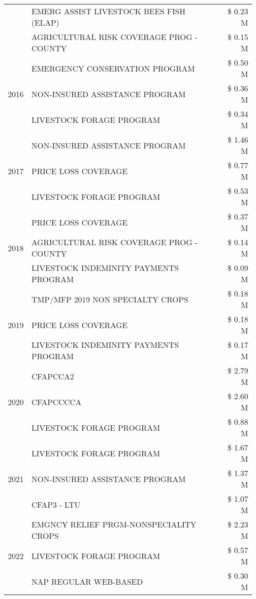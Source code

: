 \begin{tabular}{llr}
 & EMERG ASSIST LIVESTOCK BEES FISH (ELAP) & \$ 0.23 M \\
 & AGRICULTURAL RISK COVERAGE PROG - COUNTY & \$ 0.15 M \\
\cline{1-3}
\multirow[t]{3}{*}{2016} & EMERGENCY CONSERVATION PROGRAM & \$ 0.50 M \\
 & NON-INSURED ASSISTANCE PROGRAM & \$ 0.36 M \\
 & LIVESTOCK FORAGE PROGRAM & \$ 0.34 M \\
\cline{1-3}
\multirow[t]{3}{*}{2017} & NON-INSURED ASSISTANCE PROGRAM & \$ 1.46 M \\
 & PRICE LOSS COVERAGE & \$ 0.77 M \\
 & LIVESTOCK FORAGE PROGRAM & \$ 0.53 M \\
\cline{1-3}
\multirow[t]{3}{*}{2018} & PRICE LOSS COVERAGE & \$ 0.37 M \\
 & AGRICULTURAL RISK COVERAGE PROG - COUNTY & \$ 0.14 M \\
 & LIVESTOCK INDEMINITY PAYMENTS PROGRAM & \$ 0.09 M \\
\cline{1-3}
\multirow[t]{3}{*}{2019} & TMP/MFP 2019 NON SPECIALTY CROPS & \$ 0.18 M \\
 & PRICE LOSS COVERAGE & \$ 0.18 M \\
 & LIVESTOCK INDEMINITY PAYMENTS PROGRAM & \$ 0.17 M \\
\cline{1-3}
\multirow[t]{3}{*}{2020} & CFAPCCA2 & \$ 2.79 M \\
 & CFAPCCCCA & \$ 2.60 M \\
 & LIVESTOCK FORAGE PROGRAM & \$ 0.88 M \\
\cline{1-3}
\multirow[t]{3}{*}{2021} & LIVESTOCK FORAGE PROGRAM & \$ 1.67 M \\
 & NON-INSURED ASSISTANCE PROGRAM & \$ 1.37 M \\
 & CFAP3 - LTU & \$ 1.07 M \\
\cline{1-3}
\multirow[t]{3}{*}{2022} & EMGNCY RELIEF PRGM-NONSPECIALITY CROPS & \$ 2.23 M \\
 & LIVESTOCK FORAGE PROGRAM & \$ 0.57 M \\
 & NAP REGULAR WEB-BASED & \$ 0.30 M \\
\cline{1-3}
\bottomrule
\end{tabular}
